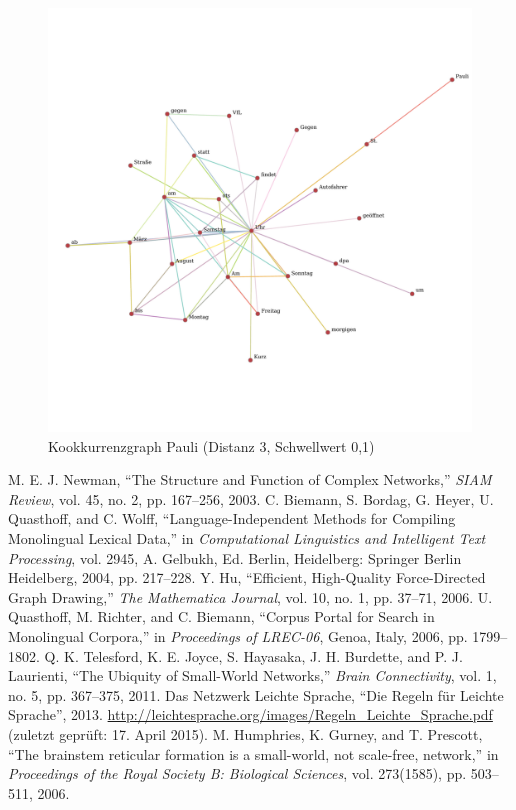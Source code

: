 \documentclass[11pt, a4paper]{article}
\begin{document}
\begin{figure}[hp!]
    \centering
        \includegraphics[scale=.4]{../../data/results/longpath_wordgraphs/den/graph_Pauli.pdf}
    \caption{Kookkurrenzgraph Pauli (Distanz 3, Schwellwert 0,1)}
    \label{fig:lp-pauli}
\end{figure}


\pagebreak
\begin{thebibliography}{9}
     M. E. J. Newman, “The Structure and Function of Complex Networks,” \emph{SIAM Review}, vol. 45, no. 2, pp. 167–256, 2003.
     C. Biemann, S. Bordag, G. Heyer, U. Quasthoff, and C. Wolff, “Language-Independent Methods for Compiling Monolingual Lexical Data,” in \emph{Computational Linguistics and Intelligent Text Processing}, vol. 2945, A. Gelbukh, Ed. Berlin, Heidelberg: Springer Berlin Heidelberg, 2004, pp. 217–228.
     Y. Hu, “Efficient, High-Quality Force-Directed Graph Drawing,” \emph{The Mathematica Journal}, vol. 10, no. 1, pp. 37–71, 2006.
    U. Quasthoff, M. Richter, and C. Biemann, “Corpus Portal for Search in Monolingual Corpora,” in \emph{Proceedings of LREC-06}, Genoa, Italy, 2006, pp. 1799–1802.
    Q. K. Telesford, K. E. Joyce, S. Hayasaka, J. H. Burdette, and P. J. Laurienti, “The Ubiquity of Small-World Networks,” \emph{Brain Connectivity}, vol. 1, no. 5, pp. 367–375, 2011.
     Das Netzwerk Leichte Sprache, “Die Regeln für Leichte Sprache”, 2013. \url{http://leichtesprache.org/images/Regeln_Leichte_Sprache.pdf} (zuletzt geprüft: 17. April 2015).
    M. Humphries, K. Gurney, and T. Prescott, “The brainstem reticular formation is a small-world, not scale-free, network,” in \emph{Proceedings of the Royal Society B: Biological Sciences}, vol. 273(1585), pp. 503–511, 2006.
\end{thebibliography}

\listoftables

\listoffigures
\end{document}
